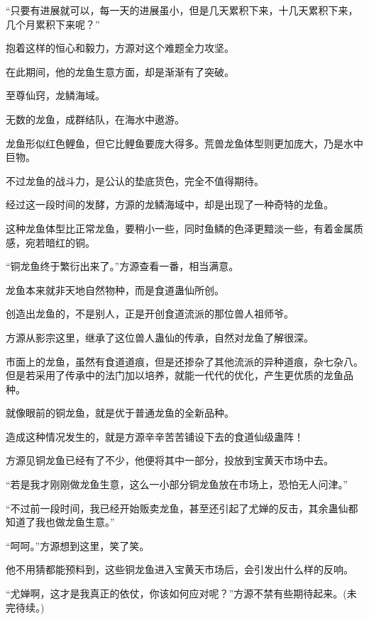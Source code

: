 \begin{this_body}
“只要有进展就可以，每一天的进展虽小，但是几天累积下来，十几天累积下来，几个月累积下来呢？”

抱着这样的恒心和毅力，方源对这个难题全力攻坚。

在此期间，他的龙鱼生意方面，却是渐渐有了突破。

至尊仙窍，龙鳞海域。

无数的龙鱼，成群结队，在海水中遨游。

龙鱼形似红色鲤鱼，但它比鲤鱼要庞大得多。荒兽龙鱼体型则更加庞大，乃是水中巨物。

不过龙鱼的战斗力，是公认的垫底货色，完全不值得期待。

经过这一段时间的发酵，方源的龙鳞海域中，却是出现了一种奇特的龙鱼。

这种龙鱼体型比正常龙鱼，要稍小一些，同时鱼鳞的色泽更黯淡一些，有着金属质感，宛若暗红的铜。

“铜龙鱼终于繁衍出来了。”方源查看一番，相当满意。

龙鱼本来就非天地自然物种，而是食道蛊仙所创。

创造出龙鱼的，不是别人，正是开创食道流派的那位兽人祖师爷。

方源从影宗这里，继承了这位兽人蛊仙的传承，自然对龙鱼了解很深。

市面上的龙鱼，虽然有食道道痕，但是还掺杂了其他流派的异种道痕，杂七杂八。但是若采用了传承中的法门加以培养，就能一代代的优化，产生更优质的龙鱼品种。

就像眼前的铜龙鱼，就是优于普通龙鱼的全新品种。

造成这种情况发生的，就是方源辛辛苦苦铺设下去的食道仙级蛊阵！

方源见铜龙鱼已经有了不少，他便将其中一部分，投放到宝黄天市场中去。

“若是我才刚刚做龙鱼生意，这么一小部分铜龙鱼放在市场上，恐怕无人问津。”

“不过前一段时间，我已经开始贩卖龙鱼，甚至还引起了尤婵的反击，其余蛊仙都知道了我也做龙鱼生意。”

“呵呵。”方源想到这里，笑了笑。

他不用猜都能预料到，这些铜龙鱼进入宝黄天市场后，会引发出什么样的反响。

“尤婵啊，这才是我真正的依仗，你该如何应对呢？”方源不禁有些期待起来。(未完待续。)

\end{this_body}

